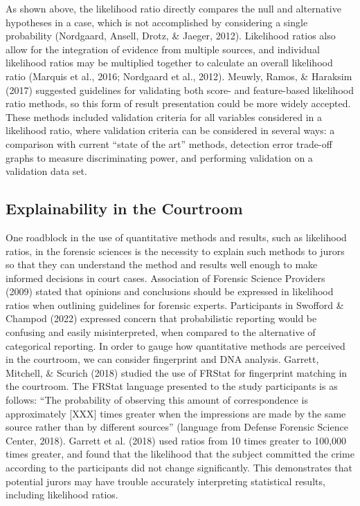 \documentclass[print]{nuthesis}
\begin{document}
As shown above, the likelihood ratio directly compares the null and alternative hypotheses in a case, which is not accomplished by considering a single probability (Nordgaard, Ansell, Drotz, \& Jaeger, 2012).
Likelihood ratios also allow for the integration of evidence from multiple sources, and individual likelihood ratios may be multiplied together to calculate an overall likelihood ratio (Marquis et al., 2016; Nordgaard et al., 2012).
Meuwly, Ramos, \& Haraksim (2017) suggested guidelines for validating both score- and feature-based likelihood ratio methods, so this form of result presentation could be more widely accepted.
These methods included validation criteria for all variables considered in a likelihood ratio, where validation criteria can be considered in several ways: a comparison with current ``state of the art'' methods, detection error trade-off graphs to measure discriminating power, and performing validation on a validation data set.

\hypertarget{explainability-in-the-courtroom}{%
\subsection{Explainability in the Courtroom}\label{explainability-in-the-courtroom}}

One roadblock in the use of quantitative methods and results, such as likelihood ratios, in the forensic sciences is the necessity to explain such methods to jurors so that they can understand the method and results well enough to make informed decisions in court cases.
Association of Forensic Science Providers (2009) stated that opinions and conclusions should be expressed in likelihood ratios when outlining guidelines for forensic experts.
Participants in Swofford \& Champod (2022) expressed concern that probabilistic reporting would be confusing and easily misinterpreted, when compared to the alternative of categorical reporting.
In order to gauge how quantitative methods are perceived in the courtroom, we can consider fingerprint and DNA analysis.
Garrett, Mitchell, \& Scurich (2018) studied the use of FRStat for fingerprint matching in the courtroom.
The FRStat language presented to the study participants is as follows: ``The probability of observing this amount of correspondence is approximately {[}XXX{]} times greater when the impressions are made by the same source rather than by different sources'' (language from Defense Forensic Science Center, 2018).
Garrett et al. (2018) used ratios from 10 times greater to 100,000 times greater, and found that the likelihood that the subject committed the crime according to the participants did not change significantly.
This demonstrates that potential jurors may have trouble accurately interpreting statistical results, including likelihood ratios.
\end{document}
